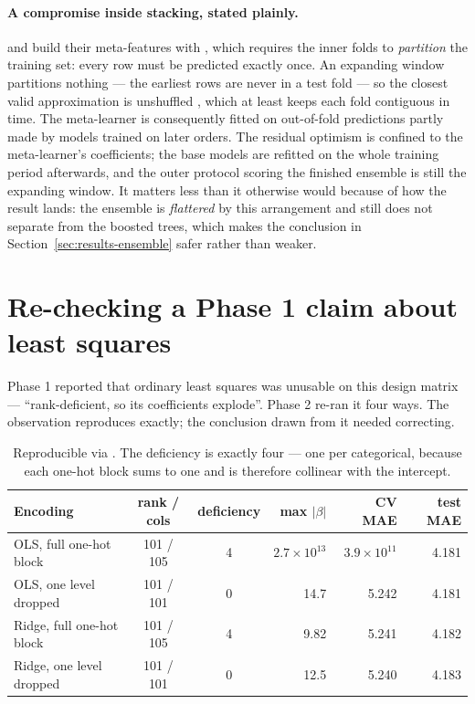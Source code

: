 \paragraph{A compromise inside stacking, stated plainly.}
 and  build their meta-features
with , which requires the inner folds to \emph{partition}
the training set: every row must be predicted exactly once. An expanding window
partitions nothing --- the earliest rows are never in a test fold --- so the
closest valid approximation is unshuffled , which at least keeps each
fold contiguous in time. The meta-learner is consequently fitted on out-of-fold
predictions partly made by models trained on later orders. The residual optimism
is confined to the meta-learner's coefficients; the base models are refitted on
the whole training period afterwards, and the outer protocol scoring the
finished ensemble is still the expanding window. It matters less than it
otherwise would because of how the result lands: the ensemble is
\emph{flattered} by this arrangement and still does not separate from the
boosted trees, which makes the conclusion in
Section~\ref{sec:results-ensemble} safer rather than weaker.

\section{Re-checking a Phase 1 claim about least squares}
\label{app:encoding}

Phase 1 reported that ordinary least squares was unusable on this design matrix
--- ``rank-deficient, so its coefficients explode''. Phase 2 re-ran it four ways.
The observation reproduces exactly; the conclusion drawn from it needed
correcting.

\begin{table}[htbp]
\centering
\caption{Reproducible via . The
deficiency is exactly four --- one per categorical, because each one-hot block
sums to one and is therefore collinear with the intercept.}
\label{tab:encoding}
\small
\begin{tabular}{@{}lccrrr@{}}
\toprule
\textbf{Encoding} & \textbf{rank / cols} & \textbf{deficiency} &
\textbf{max $|\beta|$} & \textbf{CV MAE} & \textbf{test MAE} \\
\midrule
OLS, full one-hot block   & 101 / 105 & 4 & $2.7\times10^{13}$ & $3.9\times10^{11}$ & 4.181 \\
OLS, one level dropped    & 101 / 101 & 0 & 14.7  & 5.242 & 4.181 \\
Ridge, full one-hot block & 101 / 105 & 4 & 9.82  & 5.241 & 4.182 \\
Ridge, one level dropped  & 101 / 101 & 0 & 12.5  & 5.240 & 4.183 \\
\bottomrule
\end{tabular}
\end{table}

